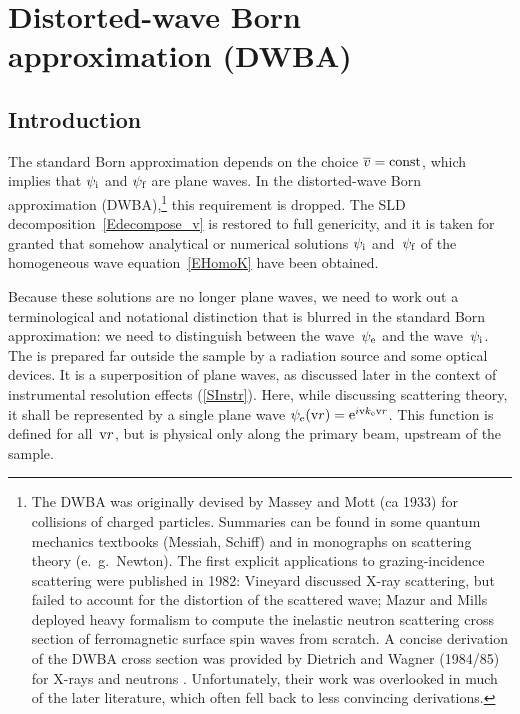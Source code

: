 \section{Distorted-wave Born approximation (DWBA)}\label{SDWBA}

%
%

\subsection{Introduction}\label{SDWBA1}

The standard Born approximation depends on the choice $\mv=\text{const}$,
which implies that $\psi_\si$ and $\psi_\sf$ are plane waves.
In the distorted-wave Born approximation (DWBA),\footnote{
The DWBA was originally devised by Massey and Mott (ca 1933)
for collisions of charged particles.
Summaries can be found in some quantum mechanics textbooks (Messiah, Schiff)
and in monographs on scattering theory (e.~g.\ Newton).
The first explicit applications to grazing-incidence scattering
were published in 1982:
Vineyard \cite{Vin82} discussed X-ray scattering,
but failed to account for the distortion of the scattered wave;
Mazur and Mills \cite{MaMi82} deployed heavy formalism
to compute the inelastic neutron scattering cross section
of ferromagnetic surface spin waves from scratch.
A concise derivation of the DWBA cross section
was provided by Dietrich and Wagner (1984/85)
for X-rays \cite{DiWa84} and neutrons \cite{DiWa85}.
Unfortunately, their work was overlooked in much of the later literature,
which often fell back to less convincing derivations.}
this requirement is dropped.
The SLD decomposition~\cref{Edecompose_v}
is restored to full genericity,
and it is taken for granted
that somehow analytical or numerical solutions $\psi_\si$ and~$\psi_\sf$
of the homogeneous wave equation~\cref{EHomoK}
have been obtained.

Because these solutions are no longer plane waves,
we need to work out a terminological and notational distinction
that is blurred in the standard Born approximation:
we need to distinguish
 between the  wave~$\psi_\se$
%
and the  wave~$\psi_\si$.
The 
%
%
is prepared far
outside the sample by a radiation source and some optical devices.
%
It is a superposition of plane waves,
as discussed later in the context of instrumental resolution effects
(\cref{SInstr}).
Here, while discussing scattering theory,
it shall be represented by a single plane wave
$\psi_\se(\r)=\e^{i\k_\se\r}$.
This function is defined for all~$\r$,
but is physical only along the primary beam, upstream of the sample.

